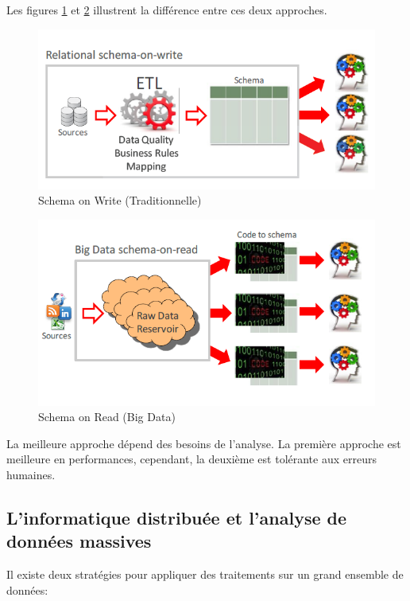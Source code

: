 		 Les figures \ref{fig:on-write} et \ref{fig:on-read} illustrent la différence entre ces deux approches.
		\begin{figure}[H]
			\centering
			\includegraphics[width=0.8\linewidth]{illustrations/on-write}
			\caption{Schema on Write (Traditionnelle)}
			\label{fig:on-write}
		\end{figure}
		\begin{figure}[H]
			\centering
			\captionsetup{justification=centering}
			\includegraphics[width=0.8\linewidth]{illustrations/on-read}
			\caption{Schema on Read (Big Data)}
			\label{fig:on-read}
		\end{figure}
		
		La meilleure approche dépend des besoins de l'analyse. La première approche est meilleure en performances, cependant, la deuxième est tolérante aux erreurs  humaines.
		
		
		\subsection{L'informatique distribuée et l'analyse de données massives} \label{sec:distruted-camput}
		Il existe deux stratégies pour appliquer des traitements sur un grand ensemble de données: 
		
